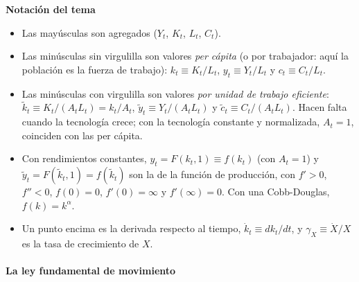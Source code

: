 \documentclass[11pt]{article}
\begin{document}
\begin{anotaciones}
\textbf{Notación del tema}
\begin{itemize}
\item Las mayúsculas son agregados ($Y_t$, $K_t$, $L_t$, $C_t$).
\item Las minúsculas sin virgulilla son valores \emph{per cápita} (o por trabajador: aquí la población es la fuerza de trabajo): $k_t\equiv K_t/L_t$, $y_t\equiv Y_t/L_t$ y $c_t\equiv C_t/L_t$.
\item Las minúsculas con virgulilla son valores \emph{por unidad de trabajo eficiente}: $\tilde k_t\equiv K_t/(A_tL_t)=k_t/A_t$, $\tilde y_t\equiv Y_t/(A_tL_t)$ y $\tilde c_t\equiv C_t/(A_tL_t)$. Hacen falta cuando la tecnología crece; con la tecnología constante y normalizada, $A_t=1$, coinciden con las per cápita.
\item Con rendimientos constantes, $y_t=F(k_t,1)\equiv f(k_t)$ (con $A_t=1$) y $\tilde y_t=F(\tilde k_t,1)=f(\tilde k_t)$ son la  de la función de producción, con $f'>0$, $f''<0$, $f(0)=0$, $f'(0)=\infty$ y $f'(\infty)=0$. Con una Cobb-Douglas, $f(k)=k^{\alpha}$.
\item Un punto encima es la derivada respecto al tiempo, $\dot k_t\equiv dk_t/dt$, y $\gamma_X\equiv\dot X/X$ es la tasa de crecimiento de $X$.
\end{itemize}
\end{anotaciones}

\paragraph{La ley fundamental de movimiento}
\end{document}
